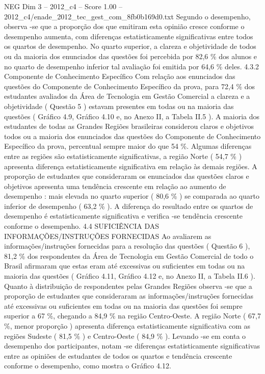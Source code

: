 \begin{textsample}{NEG Dim 3 – 2012\_c4 – Score 1.00 – 2012\_c4/enade\_2012\_tec\_gest\_com\_8fb0b169d0.txt}
Segundo o desempenho, observa -se que a proporção dos que emitiram esta opinião cresce conforme o desempenho aumenta, com diferenças estatisticamente significativas entre todos os quartos de desempenho.
No quarto superior, a clareza e objetividade de todos ou da maioria dos enunciados das questões foi percebida por 82,6 \% dos alunos e no quarto de desempenho inferior tal avaliação foi emitida por 64,6 \% deles. 4.3.2 Componente de Conhecimento Específico Com relação aos enunciados das questões do Componente de Conhecimento Específico da prova, para 72,4 \% dos estudantes avaliados da Área de Tecnologia em Gestão Comercial a clareza e a objetividade ( Questão 5 ) estavam presentes em todas ou na maioria das questões ( Gráfico 4.9, Gráfico 4.10 e, no Anexo II, a Tabela II.5 ).
A maioria dos estudantes de todas as Grandes Regiões brasileiras considerou claros e objetivos todos ou a maioria dos enunciados das questões do Componente de Conhecimento Específico da prova, percentual sempre maior do que 54 \%.
Algumas diferenças entre as regiões são estatisticamente significativas, a região Norte ( 54,7 \% ) apresenta diferença estatisticamente significativa em relação às demais regiões.
A proporção de estudantes que consideraram os enunciados das questões claros e objetivos apresenta uma tendência crescente em relação ao aumento de desempenho : mais elevada no quarto superior ( 80,6 \% ) se comparada ao quarto inferior de desempenho ( 63,2 \% ).
A diferença do resultado entre os quartos de desempenho é estatisticamente significativa e verifica -se tendência crescente conforme o desempenho. 4.4 SUFICIÊNCIA DAS INFORMAÇÕES/INSTRUÇÕES FORNECIDAS Ao avaliarem as informações/instruções fornecidas para a resolução das questões ( Questão 6 ), 81,2 \% dos respondentes da Área de Tecnologia em Gestão Comercial de todo o Brasil afirmaram que estas eram até excessivas ou suficientes em todas ou na maioria das questões ( Gráfico 4.11, Gráfico 4.12 e, no Anexo II, a Tabela II.6 ).
Quanto à distribuição de respondentes pelas Grandes Regiões observa -se que a proporção de estudantes que consideraram as informações/instruções fornecidas até excessivas ou suficientes em todas ou na maioria das questões foi sempre superior a 67 \%, chegando a 84,9 \% na região Centro-Oeste.
A região Norte ( 67,7 \%, menor proporção ) apresenta diferença estatisticamente significativa com as regiões Sudeste ( 81,5 \% ) e Centro-Oeste ( 84,9 \% ).
Levando -se em conta o desempenho dos participantes, notam -se diferenças estatisticamente significativas entre as opiniões de estudantes de todos os quartos e tendência crescente conforme o desempenho, como mostra o Gráfico 4.12.

\end{textsample}
